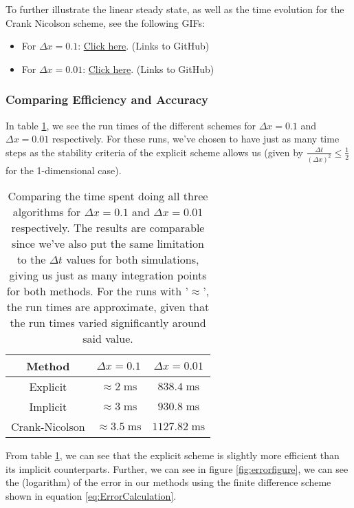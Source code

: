 \documentclass[reprint,english,notitlepage]{revtex4-1}  %
\begin{document}
To further illustrate the linear steady state, as well as the time evolution for the Crank Nicolson scheme, see the following GIFs:
\begin{itemize}
    \item For $\Delta x = 0.1$: \href{https://github.com/Jan-Egil/FYS3150/blob/master/Project5/Project5/GIF/CNdelx10.gif}{Click here}. (Links to GitHub)
    \item For $\Delta x = 0.01$: \href{https://github.com/Jan-Egil/FYS3150/blob/master/Project5/Project5/GIF/CNdelx100.gif}{Click here}. (Links to GitHub)
\end{itemize}

\newpage

\subsubsection{Comparing Efficiency and Accuracy}

In table \ref{tab:timespent}, we see the run times of the different schemes for $\Delta x = 0.1$ and $\Delta x = 0.01$ respectively. For these runs, we've chosen to have just as many time steps as the stability criteria of the explicit scheme allows us (given by $\frac{\Delta t}{(\Delta x)^2} \leq \frac{1}{2}$ for the 1-dimensional case).

\begin{table}[h!]
    \centering
    \begin{tabular}{|c|c|c|}
        \hline 
         Method&$\Delta x = 0.1$&$\Delta x = 0.01$\\
         \hline \hline
         Explicit&$\approx 2\;\text{ms}$&$838.4\;\text{ms}$\\
         Implicit&$\approx 3\;\text{ms}$&$930.8\;\text{ms}$\\
         Crank-Nicolson&$\approx 3.5\;\text{ms}$&$1127.82\;\text{ms}$\\
         \hline
    \end{tabular}
    \caption{Comparing the time spent doing all three algorithms for $\Delta x = 0.1$ and $\Delta x = 0.01$ respectively. The results are comparable since we've also put the same limitation to the $\Delta t$ values for both simulations, giving us just as many integration points for both methods. For the runs with '$\approx$', the run times are approximate, given that the run times varied significantly around said value.}
    \label{tab:timespent}
\end{table}

From table \ref{tab:timespent}, we can see that the explicit scheme is slightly more efficient than its implicit counterparts. Further, we can see in figure \ref{fig:errorfigure}, we can see the (logarithm) of the error in our methods using the finite difference scheme shown in equation \ref{eq:ErrorCalculation}.
\end{document}
